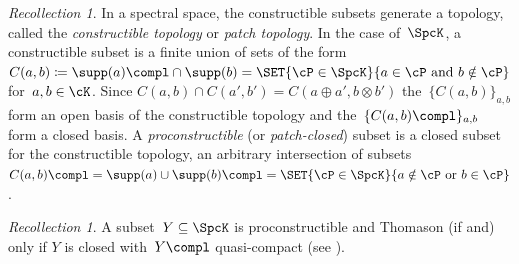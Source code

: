 \documentclass[11pt]{amsart}
\numberwithin{equation}{section} %
\theoremstyle{plain}
\theoremstyle{definition}
\theoremstyle{remark}
\newtheorem{rec}[equation]{Recollection}
\begin{document}
%
\begin{rec}
\label{rec:constructible}%
In a spectral space, the constructible subsets generate a topology, called the \emph{constructible topology} or \emph{patch topology}. 
In the case of~$\SpcK$, a constructible subset is a finite union of sets of the form~$C(a,b)\coloneq\supp(a)\compl\cap \supp(b)=\SET{\cP\in\SpcK}{a\in\cP\textrm{ and }b\notin\cP}$ for~$a,b\in\cK$. Since $C(a,b)\cap C(a',b')=C(a\oplus a',b\otimes b')$ the~$\{C(a,b)\}_{a,b}$ form an open basis of the constructible topology and the~$\{C(a,b)\compl\}_{a,b}$ form a closed basis.
A \emph{proconstructible} (or \emph{patch-closed}) subset is a closed subset for the constructible topology, \ie an arbitrary intersection of subsets~$C(a,b)\compl=\supp(a)\cup \supp(b)\compl=\SET{\cP\in\SpcK}{a\notin\cP\textrm{ or }b\in\cP}$.
\end{rec}

\begin{rec}
\label{rec:Thom-and-proconst}%
A subset~$Y\subseteq \SpcK$ is proconstructible and Thomason (if and) only if $Y$ is closed with~$Y\compl$ quasi-compact (see \cite[Theorem 1.5.4\,(i) and Corollary 4.1.6\,(ii)]{DickmannSchwartzTressl19}).
\end{rec}
\end{document}
